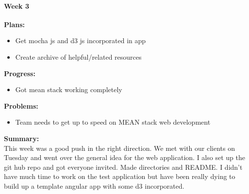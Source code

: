 \paragraph{Week 3}
\begin{adjustwidth}{2.5em}{0pt}
    \vspace{-0.5cm}\textbf{Plans:}
    \vspace{-0.5cm}
    \begin{itemize}
        \item Get mocha js and d3 js incorporated in app
        \item Create archive of helpful/related resources 
    \end{itemize} 
    \vspace{-0.3cm}\textbf{Progress:}
    \vspace{-0.5cm}
    \begin{itemize}
        \item Got mean stack working completely
    \end{itemize} 
    \vspace{-0.3cm}\textbf{Problems:}
    \vspace{-0.5cm}
    \begin{itemize}
        \item Team needs to get up to speed on MEAN stack web development
    \end{itemize}  
    \vspace{-0.3cm}\noindent\textbf{Summary:}\\
    \noindent This week was a good push in the right direction. We met with our clients on Tuesday and went over the general idea for the web application.
    I also set up the git hub repo and got everyone invited. Made directories and README. I didn't have much time to work on the test application but have been really dying to build up a template angular app with some d3 incorporated.
\end{adjustwidth} 
